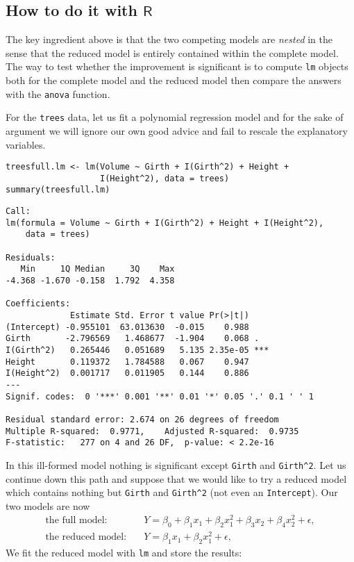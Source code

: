 \subsection{How to do it with \(\mathsf{R}\)}
\label{sec-12-5-1}

The key ingredient above is that the two competing models are \emph{nested}
in the sense that the reduced model is entirely contained within the
complete model. The way to test whether the improvement is significant
is to compute \texttt{lm} objects both for the complete model and the reduced
model then compare the answers with the \texttt{anova} function.

\label{exa-mlr-trees-poly-no-rescale} For the \texttt{trees} data, let us fit a
polynomial regression model and for the sake of argument we will
ignore our own good advice and fail to rescale the explanatory
variables.

\begin{verbatim}
treesfull.lm <- lm(Volume ~ Girth + I(Girth^2) + Height + 
                   I(Height^2), data = trees)
summary(treesfull.lm)
\end{verbatim}

\begin{verbatim}
Call:
lm(formula = Volume ~ Girth + I(Girth^2) + Height + I(Height^2), 
    data = trees)

Residuals:
   Min     1Q Median     3Q    Max 
-4.368 -1.670 -0.158  1.792  4.358 

Coefficients:
             Estimate Std. Error t value Pr(>|t|)    
(Intercept) -0.955101  63.013630  -0.015    0.988    
Girth       -2.796569   1.468677  -1.904    0.068 .  
I(Girth^2)   0.265446   0.051689   5.135 2.35e-05 ***
Height       0.119372   1.784588   0.067    0.947    
I(Height^2)  0.001717   0.011905   0.144    0.886    
---
Signif. codes:  0 '***' 0.001 '**' 0.01 '*' 0.05 '.' 0.1 ' ' 1

Residual standard error: 2.674 on 26 degrees of freedom
Multiple R-squared:  0.9771,	Adjusted R-squared:  0.9735 
F-statistic:   277 on 4 and 26 DF,  p-value: < 2.2e-16
\end{verbatim}

In this ill-formed model nothing is significant except \texttt{Girth} and
\texttt{Girth\textasciicircum{}2}. Let us continue down this path and suppose that we would
like to try a reduced model which contains nothing but \texttt{Girth} and
\texttt{Girth\textasciicircum{}2} (not even an \texttt{Intercept}). Our two models are now
\begin{align*} 
\mbox{the full model:} & \quad Y=\beta_{0}+\beta_{1}x_{1}+\beta_{2}x_{1}^{2}+\beta_{3}x_{2}+\beta_{4}x_{2}^{2}+\epsilon,\\
\mbox{the reduced model:} & \quad Y=\beta_{1}x_{1}+\beta_{2}x_{1}^{2}+\epsilon,
\end{align*}
We fit the reduced model with \texttt{lm} and store the results:

